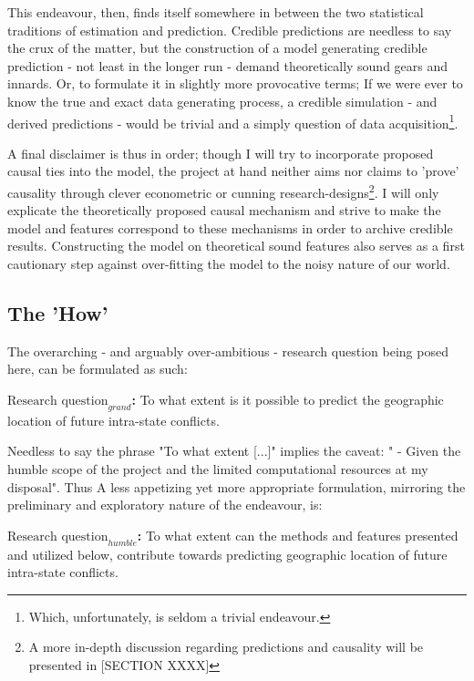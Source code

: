\documentclass[a4paper]{article}
\begin{document}
This endeavour, then, finds itself somewhere in between the two statistical traditions of estimation and prediction. Credible predictions are needless to say the crux of the matter, but the construction of a model generating credible prediction - not least in the longer run - demand theoretically sound gears and innards. Or, to formulate it in slightly more provocative terms; If we were ever to know the true and exact data generating process, a credible simulation - and derived predictions - would be trivial and a simply question of data acquisition\footnote{Which, unfortunately, is seldom a trivial endeavour.}.\par %

A final disclaimer is thus in order; though I will try to incorporate proposed causal ties into the model, the project at hand neither aims nor claims to 'prove' causality through clever econometric or cunning research-designs\footnote{A more in-depth discussion regarding predictions and causality will be presented in [SECTION XXXX]}. I will only explicate the theoretically proposed causal mechanism and strive to make the model and features correspond to these mechanisms in order to archive credible results. Constructing the model on theoretical sound features also serves as a first cautionary step against over-fitting the model to the noisy nature of our world.\par


\subsection{The 'How'}

The overarching - and arguably over-ambitious - research question being posed here, can be formulated as such:\par

\textbf{$\textrm{Research question}_{grand}$:} To what extent is it possible to predict the geographic location of future intra-state conflicts. \par

Needless to say the phrase "To what extent [...]" implies the caveat: " - Given the humble scope of the project and the limited computational resources at my disposal". Thus A less appetizing yet more appropriate formulation, mirroring the preliminary and exploratory nature of the endeavour, is:\par

\textbf{$\textrm{Research question}_{humble}$:} To what extent can the methods and features presented and utilized below, contribute towards predicting geographic location of future intra-state conflicts. \par
\end{document}
